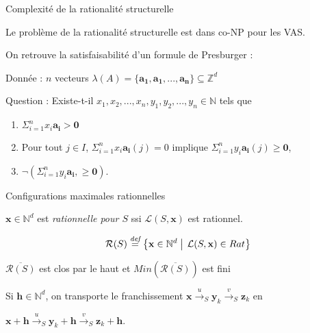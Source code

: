 \documentclass[french]{beamer}
\newcommand{\set}[2]{\left\{#1\mathrel{\left|\vphantom{#1}\vphantom{#2}\right.}#2\right\}}
\newcommand{\defeq}{\ensuremath{\stackrel{\textit{def}}{=}}}
\newcommand{\Min}{\textit{Min}}
\newcommand{\N}{\ensuremath{\mathbb{N}}}
\newcommand{\Z}{\ensuremath{\mathbb{Z}}}
\newcommand{\lang}{\ensuremath{\mathcal{L}}}
\newcommand{\trans}[2]{\ensuremath{\stackrel{#1}{\longrightarrow}_{#2}}}
\newcommand{\vect}[1]{\ensuremath{\mathbf{#1}}}
\newcommand{\inirat}{\mathcal{R}}
\let\oldemph\emph
\renewcommand{\emph}[1]{\oldemph{\color{blue}#1}}
\begin{document}
\begin{frame}{Complexité de la rationalité structurelle}
\begin{theorem}
Le  problème de la rationalité structurelle est dans co-NP pour les VAS.
\end{theorem}

On retrouve la satisfaisabilité d'un formule de Presburger :

\vspace{3mm}
Donnée : $n$ vecteurs $\lambda(A)=\{\vect{a_1}, \vect{a_1}, ..., \vect{a_n}\} \subseteq \Z^d$

Question : Existe-t-il $x_1,x_2,...,x_n, y_1,y_2,...,y_n \in\N$ tels que
\begin{enumerate}
    \item $\Sigma_{i=1}^n x_i \vect{a_i} > \vect{0}$
    \item Pour tout $j \in I$, $\Sigma_{i=1}^n x_i \vect{a_i}(j)=0$ implique $\Sigma_{i=1}^n y_i \vect{a_i}(j) \geq \vect{0}$,
    \item  $\lnot(\Sigma_{i=1}^n y_i \vect{a_i}, \geq \vect{0})$.
\end{enumerate}
\end{frame}


\begin{frame}{Configurations maximales rationnelles}
\begin{definition}
$\vect{x} \in \N^d$ est \emph{rationnelle pour $S$} ssi $\lang(S,\vect{x})$ est rationnel.

$$\inirat(S) \defeq \set{\vect{x} \in \N^d} {\lang(S,\vect{x}) \in Rat}$$
\end{definition}

\begin{theorem}
$\overline{\inirat(S)}$ est clos par le haut et 
$\Min(\overline{\inirat(S)})$ est fini
\end{theorem}

Si $\vect{h}\in\N^d$, on transporte le franchissement $\vect{x} \trans{u}{S} \vect{y}_k \trans{v}{S} \vect{z}_k$ en

$\vect{x} +\vect{h} \trans{u}{S} \vect{y}_k +\vect{h} \trans{v}{S} \vect{z}_k +\vect{h}$.
\end{frame}
\end{document}
